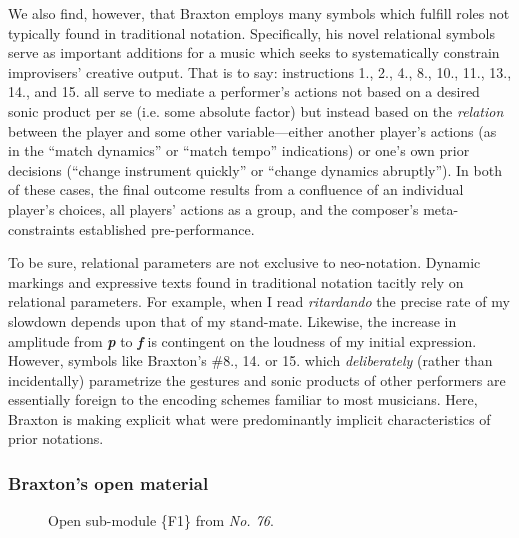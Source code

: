        We also find, however, that Braxton employs many symbols which fulfill roles not typically found in traditional notation. Specifically, his novel relational symbols serve as important additions for a music which seeks to systematically constrain improvisers' creative output. That is to say: instructions 1., 2., 4., 8., 10., 11., 13., 14., and 15. all serve to mediate a performer's actions not based on a desired sonic product per se (i.e. some absolute factor) but instead based on the \textit{relation} between the player and some other variable---either another player's actions (as in the ``match dynamics'' or ``match tempo'' indications) or one's own prior decisions (``change instrument quickly'' or ``change dynamics abruptly''). In both of these cases, the final outcome results from a confluence of an individual player's choices, all players' actions as a group, and the composer's meta-constraints established pre-performance.
    
       To be sure, relational parameters are not exclusive to neo-notation. Dynamic markings and expressive texts found in traditional notation tacitly rely on relational parameters. For example, when I read \textit{ritardando} the precise rate of my slowdown depends upon that of my stand-mate. Likewise, the increase in amplitude from \textbf{\textit{p}} to \textbf{\textit{f}} is contingent on the loudness of my initial expression. However, symbols like Braxton's \#8., 14. or 15. which \textit{deliberately} (rather than incidentally) parametrize the gestures and sonic products of other performers are essentially foreign to the encoding schemes familiar to most musicians. Here, Braxton is making explicit what were predominantly implicit characteristics of prior notations.
    
    \subsubsection{Braxton's open material}
    \label{braxtonopen}
            \begin{figure} 
                \centering
                \captionsetup{width=.55\textwidth}
                \caption[Open sub-module \{F1\} from \textit{No. 76}.]{Open sub-module \{F1\} from \textit{No. 76}.\footnotemark}
                \label{fig:openf1}
            \end{figure}
            
